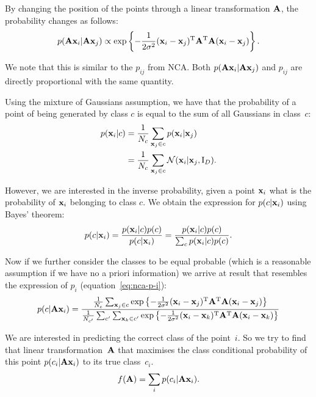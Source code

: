 	By changing the position of the points through a linear transformation $\mathbf{A}$,
	the probability changes as follows:
	\begin{align}
	    p(\mathbf{A}\mathbf{x}_i|\mathbf{A}\mathbf{x}_j) \propto \exp \left\{-\frac{1}{2\sigma^2} (\mathbf{x}_i -
	\mathbf{x}_j)^\mathrm{T}\mathbf{A}^\mathrm{T}\mathbf{A}(\mathbf{x}_i - \mathbf{x}_j)\right\}.
	\end{align}
	
	We note that this is similar to the $p_{ij}$ from NCA. Both
	$p(\mathbf{A}\mathbf{x}_i|\mathbf{A}\mathbf{x}_j)$ and $p_{ij}$ are directly proportional with the same
	quantity.
	
	Using the mixture of Gaussians assumption, we have that the probability of a
	point of being generated by class $c$ is equal to the sum of all Gaussians in
	class~$c$:
	\begin{align}
	    p(\mathbf{x}_i|c) &= \frac{1}{N_c}\sum_{\mathbf{x}_j \in c} p(\mathbf{x}_i|\mathbf{x}_j)
		\label{eq:p-x-c}
		\\
	               &= \frac{1}{N_c}\sum_{\mathbf{x}_j \in c} \mathcal{N}(\mathbf{x}_i|\mathbf{x}_j,
	\mathrm{I}_D).
	\end{align}
	
	However, we are interested in the inverse probability, given a point $\mathbf{x}_i$
	what is the probability of $\mathbf{x}_i$ belonging to class $c$. We obtain the
	expression for $p(c|\mathbf{x}_i)$ using Bayes' theorem:
	\begin{align}
	    p(c|\mathbf{x}_i) = \frac{p(\mathbf{x}_i|c)p(c)}{p(c|\mathbf{x}_i)} =
	\frac{p(\mathbf{x}_i|c)p(c)}{\sum_{c} p(\mathbf{x}_i|c)p(c)}.
	    \label{eq:nca-cc-kde-bayes}
	\end{align}
	
	Now if we further consider the classes to be equal probable (which is a
	reasonable assumption if we have no a priori information) we arrive at result
	that resembles the expression of $p_i$ (equation~\eqref{eq:nca-p-i}):
	\begin{align}
	    p(c|\mathbf{A}\mathbf{x}_i) = \frac{
	                \frac{1}{N_c}\sum_{\mathbf{x}_j \in
	c}\exp\left\{-\frac{1}{2\sigma^2}(\mathbf{x}_i -
	\mathbf{x}_j)^\mathrm{T}\mathbf{A}^\mathrm{T}\mathbf{A}(\mathbf{x}_i - \mathbf{x}_j)\right\}
	                }
	                {
	                \frac{1}{N_{c'}}\sum_{c'} \sum_{\mathbf{x}_k \in
	c'}\exp\left\{-\frac{1}{2\sigma^2}(\mathbf{x}_i -
	\mathbf{x}_k)^\mathrm{T}\mathbf{A}^\mathrm{T}\mathbf{A}(\mathbf{x}_i - \mathbf{x}_k)\right\}
	                }
	\end{align}
	
	We are interested in predicting the correct class of the point~$i$. So we
	try to find that linear transformation~$\mathbf{A}$ that maximises the class
	conditional probability of this point $p(c_i|\mathbf{A}\mathbf{x}_i)$ to its true class~$c_i$.
	\begin{align}
	    f(\mathbf{A}) = \sum_i p(c_i|\mathbf{A}\mathbf{x}_i).
	    \label{eq:nca-cc-kde-obj}
	\end{align}
	
